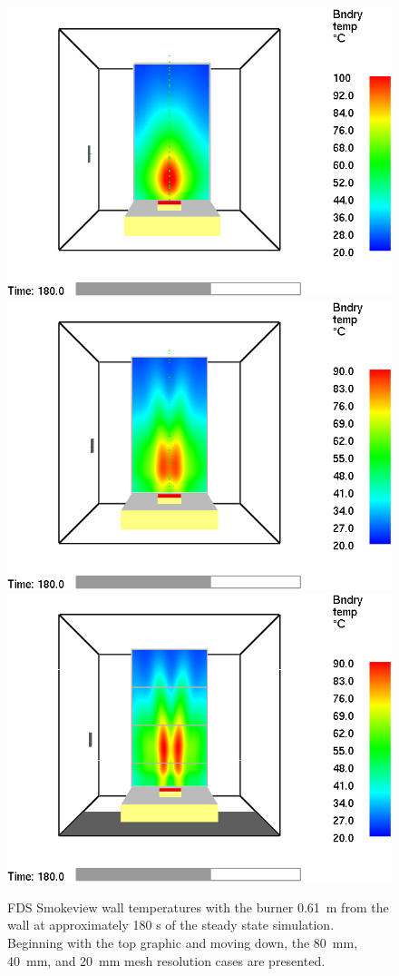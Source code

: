 \documentclass[twoside]{uocthesis}
\begin{document}
\begin{figure}[p]
	\centering
	\includegraphics[width=.625\columnwidth]{../Figures/NG_80kW_GBWall_2D_RI=05_0300WT}\\
	\includegraphics[width=.625\columnwidth]{../Figures/NG_80kW_GBWall_2D_RI=10_0300WT}\\
	\includegraphics[width=.625\columnwidth]{../Figures/NG_80kW_GBWall_2D_RI=20_0300WT}\\
	\caption[FDS Smokeview wall temperatures with the burner 0.61~m from the wall at approximately 180 s for the 80~mm, 40~mm, and 20~mm mesh resolution cases]{FDS Smokeview wall temperatures with the burner 0.61~m from the wall at approximately 180 s of the steady state simulation.  Beginning with the top graphic and moving down, the 80~mm, 40~mm, and 20~mm mesh resolution cases are presented.}
	\label{FDS_Wall_Temp_IWGB_Comp_}
\end{figure}
\end{document}
